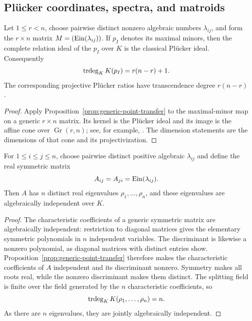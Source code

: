 \subsection{Pl\"ucker coordinates, spectra, and matroids}

\begin{corollary}
\label{cor:ein-pluecker}
Let $1\le r<n$, choose pairwise distinct nonzero algebraic numbers
$\lambda_{ij}$, and form the $r\times n$ matrix
$M=(\operatorname{Ein}(\lambda_{ij}))$.  If $p_I$ denotes its maximal minors, then the
complete relation ideal of the $p_I$ over $K$ is the classical Pl\"ucker
ideal.  Consequently
\[
 \operatorname{trdeg}_K K(p_I)=r(n-r)+1.
\]
The corresponding projective Pl\"ucker ratios have transcendence degree
$r(n-r)$.
\end{corollary}

\begin{proof}
Apply Proposition~\ref{prop:generic-point-transfer} to the maximal-minor
map on a generic $r\times n$ matrix.  Its kernel is the Pl\"ucker ideal and
its image is the affine cone over $\operatorname{Gr}(r,n)$; see, for
example, \cite{BrunsConcaVarbaro2013}.  The dimension statements are the
dimensions of that cone and its projectivization.
\end{proof}

\begin{theorem}
\label{thm:ein-symmetric-spectrum}
For $1\le i\le j\le n$, choose pairwise distinct positive algebraic
$\lambda_{ij}$ and define the real symmetric matrix
\[
 A_{ij}=A_{ji}=\operatorname{Ein}(\lambda_{ij}).
\]
Then $A$ has $n$ distinct real eigenvalues
$\rho_1,\ldots,\rho_n$, and these eigenvalues are algebraically independent
over $K$.
\end{theorem}

\begin{proof}
The characteristic coefficients of a generic symmetric matrix are
algebraically independent: restriction to diagonal matrices gives the
elementary symmetric polynomials in $n$ independent variables.  The
discriminant is likewise a nonzero polynomial, as diagonal matrices with
distinct entries show.  Proposition~\ref{prop:generic-point-transfer}
therefore makes the characteristic coefficients of $A$ independent and
its discriminant nonzero.  Symmetry makes all roots real, while the
nonzero discriminant makes them distinct.  The splitting field is finite
over the field generated by the $n$ characteristic coefficients, so
\[
 \operatorname{trdeg}_K K(\rho_1,\ldots,\rho_n)=n.
\]
As there are $n$ eigenvalues, they are jointly algebraically independent.
\end{proof}

